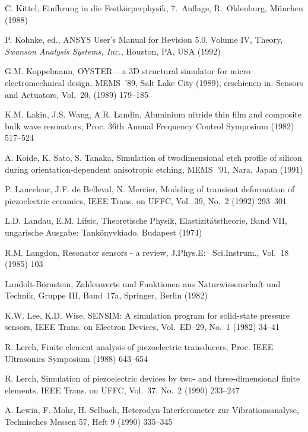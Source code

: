 \begin{thebibliography}{xxx}
 C. Kittel, Einfhrung in die Festkörperphysik, 7.~Auflage, R.~Oldenburg,
 München (1988)

 P. Kohnke, ed., {\sf ANSYS} User's Manual for Revision 5.0, Volume IV,
 Theory, {\em Swanson Analysis Systems, Inc.}, Houston, PA, USA (1992)

 G.M. Koppelmann, {\sf OYSTER} -- a 3D structural simulator for micro
 electromechnical design, MEMS~'89, Salt Lake City (1989), erschienen in:
 Sensors and Actuators, Vol.~20, (1989) 179--185

 K.M. Lakin, J.S. Wang, A.R. Landin, Aluminium nitride thin film and
 composite bulk wave resonators, Proc. 36th Annual Frequency Control
 Symposium (1982) 517--524

 A. Koide, K. Sato, S. Tanaka, Simulation of twodimensional etch profile
 of silicon during orientation-dependent anisotropic etching, MEMS~'91,
 Nara, Japan (1991)

 P. Lanceleur, J.F. de Belleval, N. Mercier, Modeling of transient
 deformation of piezoelectric ceramics, IEEE Trans. on UFFC, Vol.~39, No.~2
 (1992) 293--301

 L.D. Landau, E.M. Lifsic, Theoretische Physik, Elastizitätstheorie,
 Band VII, ungarische Ausgabe: Tankönyvkiado, Budapest (1974)

 R.M. Langdon, Resonator sensors - a review, J.Phys.E: \, Sci.Instrum.,
 Vol.~18 (1985) 103

 Landolt-Börnstein, Zahlenwerte und Funktionen aus Naturwissenschaft und
 Technik, Gruppe III, Band~17a, Springer, Berlin (1982)

 K.W. Lee, K.D. Wise, {\sf SENSIM}: A simulation program for solid-state
 pressure sensors, IEEE Trans. on Electron Devices, Vol.~ED--29, No.~1 (1982)
 34--41

 R. Lerch, Finite element analysis of piezoelectric transducers, Proc. IEEE
 Ultrasonics Symposium (1988) 643--654

 R. Lerch, Simulation of piezoelectric devices by two- and three-dimensional
 finite elements, IEEE Trans. on UFFC, Vol.~37, No.~2 (1990) 233--247

 A. Lewin, F. Mohr, H. Selbach, Heterodyn-Interferometer zur
 Vibrationsanalyse, Technisches Messen 57, Heft 9 (1990) 335--345


\end{thebibliography}
